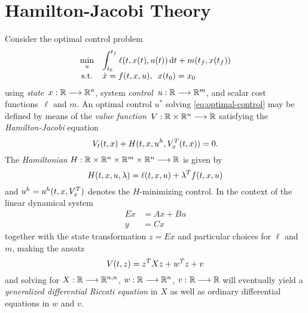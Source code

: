 \cite{DrWatson}

\section{Hamilton-Jacobi Theory}

Consider the optimal control problem
\begin{equation}
  \everymath{\displaystyle}
  \begin{array}{cl}
    \min_u & \int_{t_0}^{t_f} \ell(t, x(t), u(t)) \dt + m(t_f, x(t_f)) \\
    \text{s.t.} & \dot{x} = f(t,x,u), \enspace x(t_0) = x_0
  \end{array}
  \label{eq:optimal-control}
\end{equation}
using \emph{state}~$x:\mathbb{R}\longrightarrow\mathbb{R}^n$, system \emph{control}~$u:\mathbb{R}\longrightarrow\mathbb{R}^m$,
and scalar cost functions~$\ell$ and $m$.
An optimal control $u^*$ solving \eqref{eq:optimal-control} may be defined by means of the
\emph{value function}~$V:\mathbb{R}\times\mathbb{R}^n\longrightarrow\mathbb{R}$ satisfying the \emph{Hamilton-Jacobi} equation
\begin{equation}
  V_t(t,x) + H(t,x,u^h,V_x^T(t,x)) = 0.
  \label{eq:hamilton-jacobi}
\end{equation}
The \emph{Hamiltonian} $H:\mathbb{R}\times\mathbb{R}^n\times\mathbb{R}^m\times\mathbb{R}^n\longrightarrow\mathbb{R}$ is given by
\begin{equation}
  H(t,x,u,\lambda) = \ell(t,x,u) + \lambda^T f(t,x,u)
\end{equation}
and $u^h = u^h(t,x,V_x^T)$ denotes the $H$-minimizing control.
In the context of the linear dynamical system
\begin{equation}
  \begin{aligned}
    E\dot{x} &= Ax + Bu \\
    y &= Cx
  \end{aligned}
\end{equation}
together with the state transformation $z=Ex$ and particular choices for $\ell$ and $m$,
making the ansatz
\begin{equation}
  V(t,z) = z^T Xz + w^T z + v
\end{equation}
and solving for $X:\mathbb{R}\longrightarrow\mathbb{R}^{n,n}$, $w:\mathbb{R}\longrightarrow\mathbb{R}^n$, $v:\mathbb{R}\longrightarrow\mathbb{R}$ will eventually
yield a \emph{generalized differential Riccati equation} in $X$ as well as
ordinary differential equations in $w$ and $v$.
